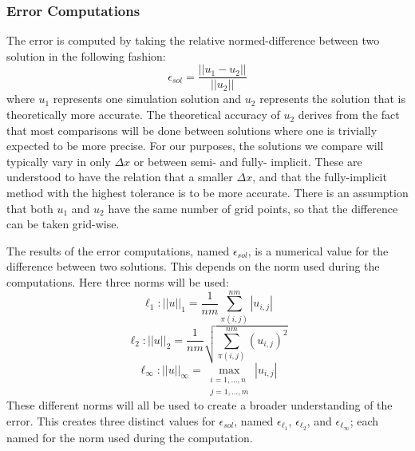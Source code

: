 \subsubsection{Error Computations}

  The error is computed by taking the relative normed-difference between two solution in the following fashion:
  \begin{equation} \label{equ:error_comp}
    \epsilon_{sol} = \frac{||u_1 - u_2||}{||u_2||}
  \end{equation}
  where $u_1$ represents one simulation solution and $u_2$ represents the solution that is theoretically more accurate.
  The theoretical accuracy of $u_2$ derives from the fact that most comparisons will be done between solutions where one is trivially expected to be more precise.
  For our purposes, the solutions we compare will typically vary in only $\Delta x$ or between semi- and fully- implicit.
  These are understood to have the relation that a smaller $\Delta x$, and that the fully-implicit method with the highest tolerance is to be more accurate.
  There is an assumption that both $u_1$ and $u_2$ have the same number of grid points, so that the difference can be taken grid-wise.

  The results of the error computations, named $\epsilon_{sol}$, is a numerical value for the difference between two solutions.
  This depends on the norm used during the computations.
  Here three norms will be used:
  \begin{equation}  \label{equ:norm_l1}
    \ell_1: ||u||_1 = \frac{1}{nm} \sum_{\pi(i,j)}^{nm} |u_{i,j}|
  \end{equation}
  \begin{equation}  \label{equ:norm_l2}
    \ell_2: ||u||_2 = \frac{1}{nm} \sqrt{\sum_{\pi(i,j)}^{nm} (u_{i,j})^2}
  \end{equation}
  \begin{equation}  \label{equ:norm_linf}
    \ell_\infty: ||u||_\infty = \max_{\substack{i=1,\ldots,n \\j=1,\ldots,m}} |u_{i,j}|
  \end{equation}
  These different norms will all be used to create a broader understanding of the error.
  This creates three distinct values for $\epsilon_{sol}$, named $\epsilon_{\ell_1}$, $\epsilon_{\ell_2}$, and $\epsilon_{\ell_\infty}$; each named for the norm used during the computation.
  

